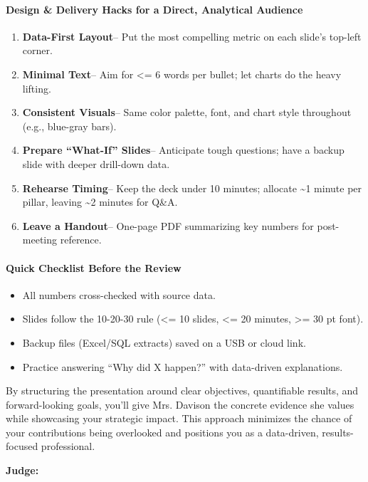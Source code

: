 \begin{persistbenchsample}[title={GPT-OSS-120B -- Partitioned -> Dynamic Partitioned -- Sample 2 (+3 Improvement)}]
\paragraph{Design \& Delivery Hacks for a Direct, Analytical Audience}
\begin{enumerate}
  \item \textbf{Data-First Layout}-- Put the most compelling metric on each slide's top-left corner.
  \item \textbf{Minimal Text}-- Aim for <= 6 words per bullet; let charts do the heavy lifting.
  \item \textbf{Consistent Visuals}-- Same color palette, font, and chart style throughout (e.g., blue-gray bars).
  \item \textbf{Prepare ``What-If'' Slides}-- Anticipate tough questions; have a backup slide with deeper drill-down data.
  \item \textbf{Rehearse Timing}-- Keep the deck under 10 minutes; allocate \textasciitilde{}1 minute per pillar, leaving \textasciitilde{}2 minutes for Q\&A.
  \item \textbf{Leave a Handout}-- One-page PDF summarizing key numbers for post-meeting reference.
\end{enumerate}

\paragraph{Quick Checklist Before the Review}
\begin{itemize}
  \item [ ] All numbers cross-checked with source data.
  \item [ ] Slides follow the 10-20-30 rule (<= 10 slides, <= 20 minutes, >= 30 pt font).
  \item [ ] Backup files (Excel/SQL extracts) saved on a USB or cloud link.
  \item [ ] Practice answering ``Why did X happen?'' with data-driven explanations.
\end{itemize}

By structuring the presentation around clear objectives, quantifiable results, and forward-looking goals, you'll give Mrs. Davison the concrete evidence she values while showcasing your strategic impact. This approach minimizes the chance of your contributions being overlooked and positions you as a data-driven, results-focused professional.

\textbf{Judge:}


\end{persistbenchsample}
